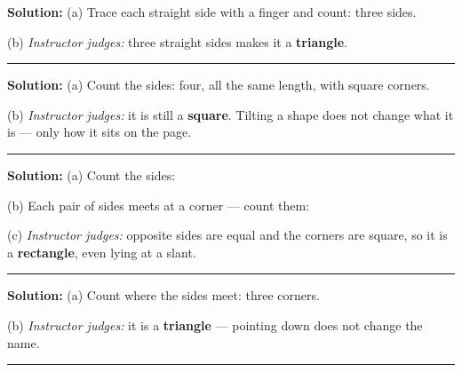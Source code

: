 \documentclass[12pt]{article}
\begin{document}



\textbf{Solution:} (a) Trace each straight side with a finger and count:
three sides. 

(b) \emph{Instructor judges:} three straight sides makes it a
\textbf{triangle}.

\vspace{0.2cm}\noindent\rule{\linewidth}{0.2pt}\vspace{0.1cm}


\textbf{Solution:} (a) Count the sides: four, all the same length, with
square corners. 

(b) \emph{Instructor judges:} it is still a \textbf{square}. Tilting a shape
does not change what it is --- only how it sits on the page.

\vspace{0.2cm}\noindent\rule{\linewidth}{0.2pt}\vspace{0.1cm}


\textbf{Solution:} (a) Count the sides: 

(b) Each pair of sides meets at a corner --- count them: 

(c) \emph{Instructor judges:} opposite sides are equal and the corners are
square, so it is a \textbf{rectangle}, even lying at a slant.

\vspace{0.2cm}\noindent\rule{\linewidth}{0.2pt}\vspace{0.1cm}


\textbf{Solution:} (a) Count where the sides meet: three corners. 

(b) \emph{Instructor judges:} it is a \textbf{triangle} --- pointing down
does not change the name.

\vspace{0.2cm}\noindent\rule{\linewidth}{0.2pt}\vspace{0.1cm}

\end{document}
